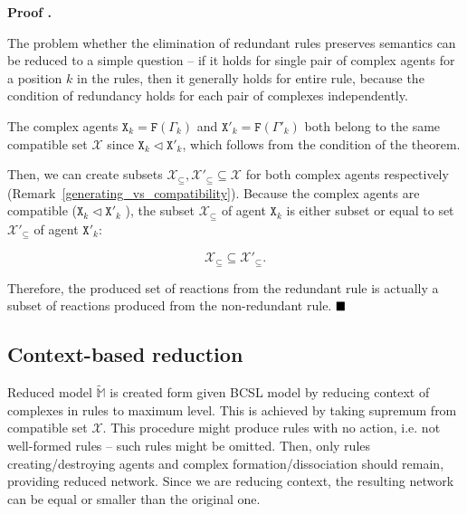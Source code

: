 \documentclass[12pt]{fithesis2}
\newcounter{counter}[section]
\renewcommand{\thecounter}{\thesection.\arabic{counter}}
\newenvironment{proof}{\bigskip\refstepcounter{counter}\noindent\textbf{Proof \thecounter}\par\nopagebreak}{\bigskip}
\newcommand*{\QEDA}{\hfill\ensuremath{\blacksquare}}%
\begin{document}
\begin{proof}
The problem whether the elimination of redundant rules preserves semantics can be reduced to a simple question -- if it holds for single pair of complex agents for a position $k$ in the rules, then it generally holds for entire rule, because the condition of redundancy holds for each pair of complexes independently.

The complex agents $\mathtt{X}_k = \mathtt{F}(\Gamma_k)$ and $\mathtt{X}'_k = \mathtt{F}(\Gamma'_k)$ both belong to the same compatible set $\mathscr{X}$ since $\mathtt{X}_k \lhd \mathtt{X}'_k$, which follows from the condition of the theorem. 

Then, we can create subsets $\mathscr{X}_\subseteq, \mathscr{X}'_\subseteq \subseteq \mathscr{X}$ for both complex agents respectively (Remark~\ref{generating_vs_compatibility}). Because the complex agents are compatible ($\mathtt{X}_k \lhd \mathtt{X}'_k$ ), the subset $\mathscr{X}_\subseteq$ of agent $\mathtt{X}_k$ is either subset or equal to set $\mathscr{X}'_\subseteq$ of agent $\mathtt{X}'_k$:

$$\mathscr{X}_\subseteq \subseteq \mathscr{X}'_\subseteq.$$

Therefore, the produced set of reactions from the redundant rule is actually a subset of reactions produced from the non-redundant rule. $\QEDA$
\end{proof}

\subsection{Context-based reduction}
\label{context_reduction}

Reduced model $\widetilde{\mathds{M}}$ is created form given BCSL model by reducing context of complexes in rules to maximum level. This is achieved by taking supremum from compatible set $\mathscr{X}$. This procedure might produce rules with no action, i.e. not well-formed rules -- such rules might be omitted. Then, only rules creating/destroying agents and complex formation/dissociation should remain, providing reduced network. Since we are reducing context, the resulting network can be equal or smaller than the original one.
\end{document}
